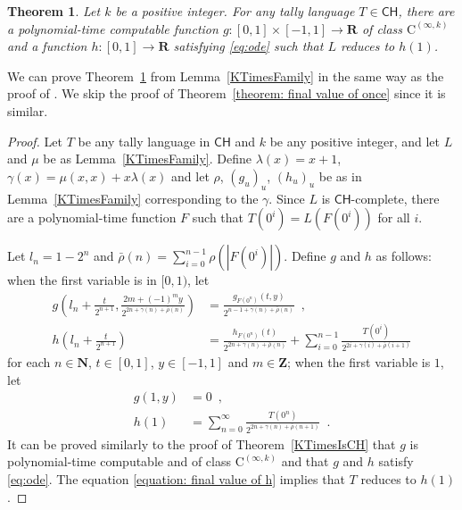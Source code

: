 \documentclass[12pt,a4paper]{article}
\newtheorem{theorem}{Theorem}%
\theoremstyle{definition}
\theoremstyle{remark}
\newcommand{\R}{\mathbf R}
\newcommand{\N}{\mathbf N}
\newcommand{\Z}{\mathbf Z}
\newcommand{\classCH}{\mathsf{CH}}
\newcommand{\classC}{\mathrm C}
\begin{document}
\begin{theorem}
\label{theorem: final value of fixed}
Let $k$ be a positive integer. 
For any tally language $T \in \classCH$,
there are a polynomial-time computable function
$g \colon [0,1] \times [-1,1] \to \R$ 
of class $\classC ^{(\infty, k)}$ and 
a function $h \colon [0,1] \to \R$
satisfying \eqref{eq:ode} 
such that $L$ reduces to $h(1)$.
\end{theorem}

We can prove Theorem~\ref{theorem: final value of fixed} 
from Lemma~\ref{KTimesFamily}
in the same way as the proof of \cite[Theorem~5.1]{kawamura2010complexity}.
We skip the proof of Theorem~\ref{theorem: final value of once}
since it is similar.

\begin{proof}
Let $T$ be any tally language in $\classCH$ and $k$ be any positive integer,
and let $L$ and $\mu$ be as Lemma~\ref{KTimesFamily}.
Define $
\lambda(x) = x + 1
$, $
\gamma(x) = \mu(x, x) + x \lambda(x)
$ and let $\rho$, $(g_u)_u$, $(h_u)_u$ be  as in Lemma~\ref{KTimesFamily} 
corresponding to the $\gamma$.
Since $L$ is $\classCH$-complete,
there are a polynomial-time function $F$ such that 
$T (0 ^i) =  L(F(0 ^i))$ for all $i$. 

Let $
l_n = 1 - 2^n
$ and $
\bar{\rho}(n) = \sum^{n-1}_{i = 0} \rho(|F(0 ^i)|)
$.  Define $g$ and $h$ as follows: 
when the first variable is in $[0,1)$, let
\begin{align}
 g \left(l_n + \frac{t}{2^{n+1}}, \frac{2m+(-1)^m y}{2^{2n+\gamma(n)+\bar{\rho}(n)}} \right)
 &=
 \frac{g_{F(0^n)}(t, y)}{2^{n-1+\gamma(n)+\bar{\rho}(n)}} \enspace ,
 \\
 h \left( l_n + \frac{t}{2^{n+1}} \right)
 &=
 \frac{h_{F(0^n)}(t)}{2^{2n+\gamma(n)+\bar{\rho}(n)}}
 + \sum^{n-1}_{i = 0} \frac{T (0^i)}{2^{2 i + \gamma (i) + \bar{\rho} (i + 1)}}
\end{align}
for each $n \in \N$, $t \in [0,1]$, $y \in [-1, 1]$ and $m \in \Z$; 
when the first variable is $1$,
let 
\begin{align} 
  g(1, y) 
&
 =
  0 \enspace, 
\\
\label{equation: final value of h}
  h(1) 
&
 = 
 \sum^\infty_{n = 0} \frac{T (0^n)}{2^{2n+\gamma(n)+\bar{\rho}(n+1)}} \enspace. 
\end{align}
It can be proved similarly to the proof of Theorem~\ref{KTimesIsCH} 
that $g$ is polynomial-time computable and of class $\classC ^{(\infty, k)}$
and that $g$ and $h$ satisfy \eqref{eq:ode}.
The equation \eqref{equation: final value of h} implies 
that $T$ reduces to $h(1)$. 
\end{proof}
\end{document}
